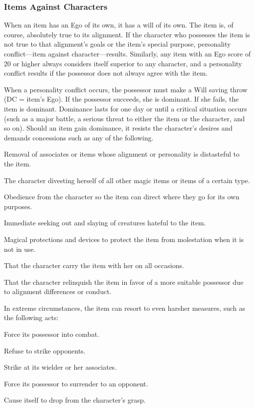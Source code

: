 \subsubsection{Items Against Characters}
When an item has an Ego of its own, it has a will of its own. The item is, of course, absolutely true to its alignment. If the character who possesses the item is not true to that alignment's goals or the item's special purpose, personality conflict---item against character---results. Similarly, any item with an Ego score of 20 or higher always considers itself superior to any character, and a personality conflict results if the possessor does not always agree with the item.

When a personality conflict occurs, the possessor must make a Will saving throw (DC = item's Ego). If the possessor succeeds, she is dominant. If she fails, the item is dominant. Dominance lasts for one day or until a critical situation occurs (such as a major battle, a serious threat to either the item or the character, and so on). Should an item gain dominance, it resists the character's desires and demands concessions such as any of the following.

\begin{itemize*}
\item Removal of associates or items whose alignment or personality is distasteful to the item.
\item The character divesting herself of all other magic items or items of a certain type.
\item Obedience from the character so the item can direct where they go for its own purposes.
\item Immediate seeking out and slaying of creatures hateful to the item.
\item Magical protections and devices to protect the item from molestation when it is not in use.
\item That the character carry the item with her on all occasions.
\item That the character relinquish the item in favor of a more suitable possessor due to alignment differences or conduct.
\end{itemize*}

In extreme circumstances, the item can resort to even harsher measures, such as the following acts:
\begin{itemize*}
\item Force its possessor into combat.
\item Refuse to strike opponents.
\item Strike at its wielder or her associates.
\item Force its possessor to surrender to an opponent.
\item Cause itself to drop from the character's grasp.
\end{itemize*}

